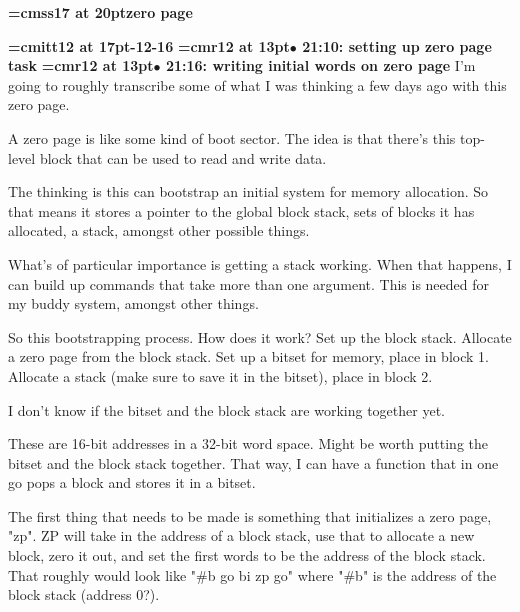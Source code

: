 {\medskip\noindent\bf\font\titlefont=cmss17 at 20pt\titlefont zero page}\medskip

{\medskip\noindent\bf\font\titlefont=cmitt12 at 17pt-12-16}\medskip
{\smallskip\noindent\bf\font\titlefont=cmr12 at 13pt\titlefont $\bullet$ 21:10: setting up zero page task}\smallskip
{\smallskip\noindent\bf\font\titlefont=cmr12 at 13pt\titlefont $\bullet$ 21:16: writing initial words on zero page}\smallskip
I'm going to roughly transcribe some of what I was thinking a few days ago with this zero page.
\par

A zero page is like some kind of boot sector. The idea is that there's this top-level block that can be used to read and write data.
\par

The thinking is this can bootstrap an initial system for memory allocation. So that means it stores a pointer to the global block stack, sets of blocks it has allocated, a stack, amongst other possible things.
\par

What's of particular importance is getting a stack working. When that happens, I can build up commands that take more than one argument. This is needed for my buddy system, amongst other things.
\par

So this bootstrapping process. How does it work? Set up the block stack. Allocate a zero page from the block stack. Set up a bitset for memory, place in block 1. Allocate a stack (make sure to save it in the bitset), place in block 2.
\par

I don't know if the bitset and the block stack are working together yet.
\par

These are 16-bit addresses in a 32-bit word space. Might be worth putting the bitset and the block stack together. That way, I can have a function that in one go pops a block and stores it in a bitset.
\par

The first thing that needs to be made is something that initializes a zero page, "zp". ZP will take in the address of a block stack, use that to allocate a new block, zero it out, and set the first words to be the address of the block stack. That roughly would look like "\#b go bi zp go" where "\#b" is the address of the block stack (address 0?).
\par


